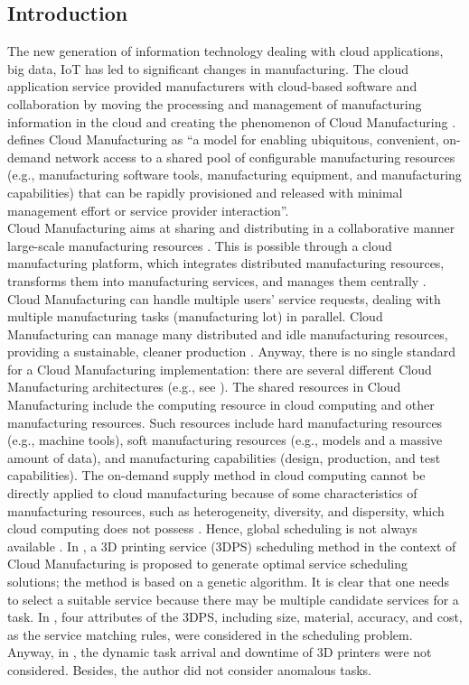 \subsection{Introduction}
The new generation of information technology dealing with cloud applications, big data, IoT has led to significant changes in manufacturing. The cloud application service provided manufacturers with cloud-based software and collaboration by moving the processing and management of manufacturing information in the cloud and creating the phenomenon of Cloud Manufacturing \parencite{bo-hu_cloud_2010}\parencite{vincent_wang_interoperable_2013}. \textcite{xu_cloud_2012} defines Cloud Manufacturing as “a model for enabling ubiquitous, convenient, on-demand network access to a shared pool of configurable manufacturing resources (e.g., manufacturing software tools, manufacturing equipment, and manufacturing capabilities) that can be rapidly provisioned and released with minimal management effort or service provider interaction”.\\
Cloud Manufacturing aims at sharing and distributing in a collaborative manner large-scale manufacturing resources \parencite{liu_workload-based_2017}. This is possible through a cloud manufacturing platform, which integrates distributed manufacturing resources, transforms them into manufacturing services, and manages them centrally \parencite{adamson_cloud_2015}\parencite{xu_cloud_2012}. Cloud Manufacturing can handle multiple users’ service requests, dealing with multiple manufacturing tasks (manufacturing lot) in parallel. Cloud Manufacturing can manage many distributed and idle manufacturing resources, providing a sustainable, cleaner production \parencite{zhang_analytical_2017}. Anyway, there is no single standard for a Cloud Manufacturing implementation: there are several different Cloud Manufacturing architectures (e.g., see \textcite{bo-hu_cloud_2010}\textcite{liu_workload-based_2017}\textcite{liu_cyber-physical_2017}). The shared resources in Cloud Manufacturing include the computing resource in cloud computing and other manufacturing resources. Such resources include hard manufacturing resources (e.g., machine tools), soft manufacturing resources (e.g., models and a massive amount of data), and manufacturing capabilities (design, production, and test capabilities). The on-demand supply method in cloud computing cannot be directly applied to cloud manufacturing because of some characteristics of manufacturing resources, such as heterogeneity, diversity, and dispersity, which cloud computing does not possess \parencite{he_state---art_2015}. Hence, global scheduling is not always available \parencite{bo-hu_cloud_2010}. In \textcite{ren_cloud_2017}, a 3D printing service (3DPS) scheduling method in the context of Cloud Manufacturing is proposed to generate optimal service scheduling solutions; the method is based on a genetic algorithm. It is clear that one needs to select a suitable service because there may be multiple candidate services for a task. In \textcite{ren_cloud_2017}, four attributes of the 3DPS, including size, material, accuracy, and cost, as the service matching rules, were considered in the scheduling problem. Anyway, in \textcite{ren_cloud_2017}, the dynamic task arrival and downtime of 3D printers were not considered. Besides, the author did not consider anomalous tasks.

